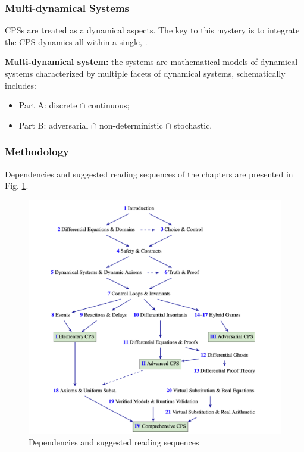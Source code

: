 \subsubsection{Multi-dynamical Systems}

CPSs are treated as a  
dynamical aspects.
The key to this mystery is to integrate the CPS dynamics all within a single,
.

\textbf{Multi-dynamical system:} the systems are mathematical models of dynamical 
systems characterized by multiple facets of dynamical systems, schematically includes:
\vspace{-.5cm}
\begin{itemize}
  \item Part A: discrete $\cap$ continuous;
  \item Part B: adversarial $\cap$ non-deterministic $\cap$ stochastic.
\end{itemize}


\subsubsection{Methodology}

Dependencies and suggested reading sequences of the chapters are presented in 
Fig. \ref{fig:socps}.

\begin{figure}[H]
  \centering
  \includegraphics[width=.85\linewidth]{notes/hybrid-dynamical-system/figures/structure-of-cps.png}
  \caption{Dependencies and suggested reading sequences}
  \label{fig:socps}
\end{figure}
